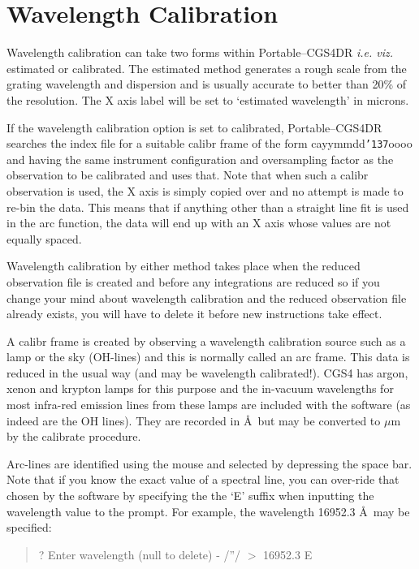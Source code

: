 \documentclass[a4paper]{book}
\renewcommand{\_}{{\tt\char'137}}
\begin{document}
\section{Wavelength Calibration}
Wavelength calibration can take two forms within Portable--CGS4DR {\em
i.e. viz.} estimated or calibrated. The estimated method generates a
rough scale from the grating wavelength and dispersion and is usually
accurate to better than 20\% of the resolution. The X axis label will be
set to `estimated wavelength' in microns.

If the wavelength calibration option is set to calibrated,
Portable--CGS4DR searches the index file for a suitable {\sc calibr} frame
of the form cayymmdd\_oooo and having the same instrument configuration
and oversampling factor as the observation to be calibrated and uses that.
Note that when such a {\sc calibr} observation is used, the X axis is
simply copied over and no attempt is made to re-bin the data. This means
that if anything other than a straight line fit is used in the {\sc arc}
function, the data will end up with an X axis whose values are not equally
spaced.

Wavelength calibration by either method takes place when the reduced
observation file is created and before any integrations are reduced so if
you change your mind about wavelength calibration and the reduced
observation file already exists, you will have to delete it before new
instructions take effect.

A {\sc calibr} frame is created by observing a wavelength calibration
source such as a lamp or the sky (OH-lines) and this is normally called an
{\sc arc} frame. This data is reduced in the usual way (and may be
wavelength calibrated!). CGS4 has argon, xenon and krypton lamps for this
purpose and the in-vacuum wavelengths for most infra-red emission lines
from these lamps are included with the software (as indeed are the OH
lines). They are recorded in \AA ~but may be converted to $\mu$m by the
calibrate procedure.

Arc-lines are identified using the mouse and selected by depressing the
space bar. Note that if you know the exact value of a spectral line, you
can over-ride that chosen by the software by specifying the the `E' suffix
when inputting the wavelength value to the prompt. For example, the
wavelength 16952.3 \AA ~may be specified:

\begin{quote}
? Enter wavelength (null to delete) - /''/ $>$ 16952.3 E
\end{quote}
\end{document}
